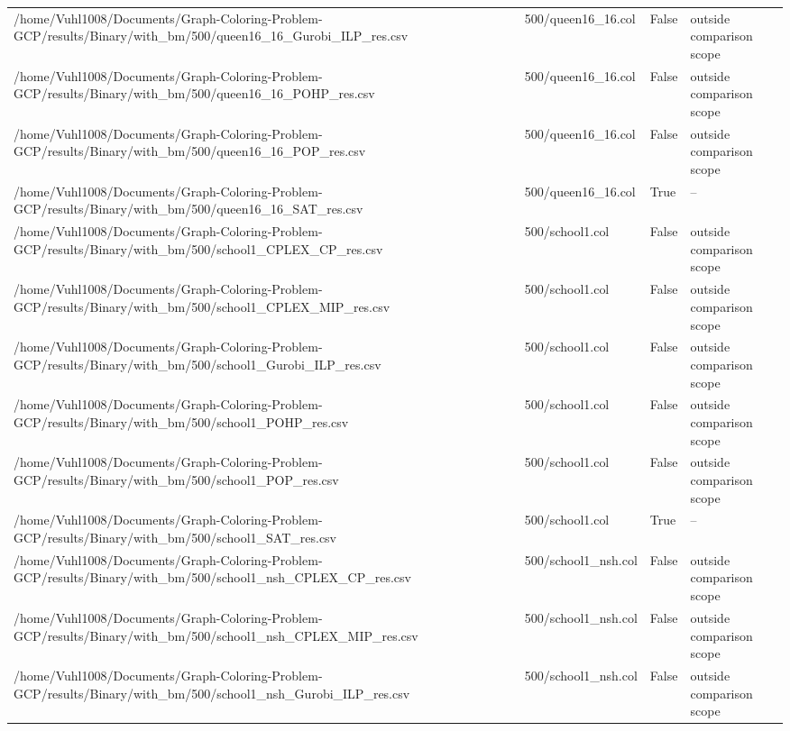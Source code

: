 \begin{table}[htbp]
\begin{tabular}{llll}
/home/Vuhl1008/Documents/Graph-Coloring-Problem-GCP/results/Binary/with\_bm/500/queen16\_16\_Gurobi\_ILP\_res.csv & 500/queen16\_16.col & False & outside comparison scope \\
/home/Vuhl1008/Documents/Graph-Coloring-Problem-GCP/results/Binary/with\_bm/500/queen16\_16\_POHP\_res.csv & 500/queen16\_16.col & False & outside comparison scope \\
/home/Vuhl1008/Documents/Graph-Coloring-Problem-GCP/results/Binary/with\_bm/500/queen16\_16\_POP\_res.csv & 500/queen16\_16.col & False & outside comparison scope \\
/home/Vuhl1008/Documents/Graph-Coloring-Problem-GCP/results/Binary/with\_bm/500/queen16\_16\_SAT\_res.csv & 500/queen16\_16.col & True & -- \\
/home/Vuhl1008/Documents/Graph-Coloring-Problem-GCP/results/Binary/with\_bm/500/school1\_CPLEX\_CP\_res.csv & 500/school1.col & False & outside comparison scope \\
/home/Vuhl1008/Documents/Graph-Coloring-Problem-GCP/results/Binary/with\_bm/500/school1\_CPLEX\_MIP\_res.csv & 500/school1.col & False & outside comparison scope \\
/home/Vuhl1008/Documents/Graph-Coloring-Problem-GCP/results/Binary/with\_bm/500/school1\_Gurobi\_ILP\_res.csv & 500/school1.col & False & outside comparison scope \\
/home/Vuhl1008/Documents/Graph-Coloring-Problem-GCP/results/Binary/with\_bm/500/school1\_POHP\_res.csv & 500/school1.col & False & outside comparison scope \\
/home/Vuhl1008/Documents/Graph-Coloring-Problem-GCP/results/Binary/with\_bm/500/school1\_POP\_res.csv & 500/school1.col & False & outside comparison scope \\
/home/Vuhl1008/Documents/Graph-Coloring-Problem-GCP/results/Binary/with\_bm/500/school1\_SAT\_res.csv & 500/school1.col & True & -- \\
/home/Vuhl1008/Documents/Graph-Coloring-Problem-GCP/results/Binary/with\_bm/500/school1\_nsh\_CPLEX\_CP\_res.csv & 500/school1\_nsh.col & False & outside comparison scope \\
/home/Vuhl1008/Documents/Graph-Coloring-Problem-GCP/results/Binary/with\_bm/500/school1\_nsh\_CPLEX\_MIP\_res.csv & 500/school1\_nsh.col & False & outside comparison scope \\
/home/Vuhl1008/Documents/Graph-Coloring-Problem-GCP/results/Binary/with\_bm/500/school1\_nsh\_Gurobi\_ILP\_res.csv & 500/school1\_nsh.col & False & outside comparison scope \\

\end{tabular}
\end{table}
